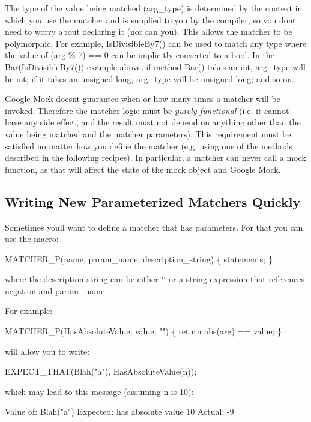 \begin{DoxyEnumerate}
\item The type of the value being matched ({\ttfamily arg\+\_\+type}) is determined by the context in which you use the matcher and is supplied to you by the compiler, so you don\textquotesingle{}t need to worry about declaring it (nor can you). This allows the matcher to be polymorphic. For example, {\ttfamily Is\+Divisible\+By7()} can be used to match any type where the value of {\ttfamily (arg \% 7) == 0} can be implicitly converted to a {\ttfamily bool}. In the {\ttfamily Bar(\+Is\+Divisible\+By7())} example above, if method {\ttfamily Bar()} takes an {\ttfamily int}, {\ttfamily arg\+\_\+type} will be {\ttfamily int}; if it takes an {\ttfamily unsigned long}, {\ttfamily arg\+\_\+type} will be {\ttfamily unsigned long}; and so on.
\end{DoxyEnumerate}
\begin{DoxyEnumerate}
\item Google Mock doesn\textquotesingle{}t guarantee when or how many times a matcher will be invoked. Therefore the matcher logic must be {\itshape purely functional} (i.\+e. it cannot have any side effect, and the result must not depend on anything other than the value being matched and the matcher parameters). This requirement must be satisfied no matter how you define the matcher (e.\+g. using one of the methods described in the following recipes). In particular, a matcher can never call a mock function, as that will affect the state of the mock object and Google Mock.
\end{DoxyEnumerate}

\subsection*{Writing New Parameterized Matchers Quickly}

Sometimes you\textquotesingle{}ll want to define a matcher that has parameters. For that you can use the macro\+: 
\begin{DoxyCode}
MATCHER\_P(name, param\_name, description\_string) \{ statements; \}
\end{DoxyCode}
 where the description string can be either {\ttfamily \char`\"{}\char`\"{}} or a string expression that references {\ttfamily negation} and {\ttfamily param\+\_\+name}.

For example\+: 
\begin{DoxyCode}
MATCHER\_P(HasAbsoluteValue, value, \textcolor{stringliteral}{""}) \{ \textcolor{keywordflow}{return} abs(arg) == value; \}
\end{DoxyCode}
 will allow you to write\+: 
\begin{DoxyCode}
EXPECT\_THAT(Blah(\textcolor{stringliteral}{"a"}), HasAbsoluteValue(n));
\end{DoxyCode}
 which may lead to this message (assuming {\ttfamily n} is 10)\+: 
\begin{DoxyCode}
Value of: Blah("a")
Expected: has absolute value 10
  Actual: -9
\end{DoxyCode}


